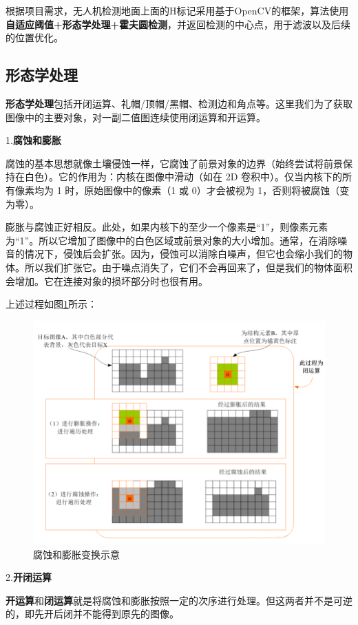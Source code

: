 根据项目需求，无人机检测地面上面的H标记采用基于OpenCV的框架，算法使用\textbf{自适应阈值+形态学处理+霍夫圆检测}，并返回检测的中心点，用于滤波以及后续的位置优化。

\subsection{形态学处理}

\textbf{形态学处理}包括开闭运算、礼帽/顶帽/黑帽、检测边和角点等。这里我们为了获取图像中的主要对象，对一副二值图连续使用闭运算和开运算。

1.\textbf{腐蚀和膨胀}

腐蚀的基本思想就像土壤侵蚀一样，它腐蚀了前景对象的边界（始终尝试将前景保持在白色）。它的作用为：内核在图像中滑动（如在 2D 卷积中）。仅当内核下的所有像素均为 1 时，原始图像中的像素（1 或 0）才会被视为 1，否则将被腐蚀（变为零）。

膨胀与腐蚀正好相反。此处，如果内核下的至少一个像素是“1”，则像素元素为“1”。所以它增加了图像中的白色区域或前景对象的大小增加。通常，在消除噪音的情况下，侵蚀后会扩张。因为，侵蚀可以消除白噪声，但它也会缩小我们的物体。所以我们扩张它。由于噪点消失了，它们不会再回来了，但是我们的物体面积会增加。它在连接对象的损坏部分时也很有用。

上述过程如图\ref{Fig:img0}所示：

\begin{figure}[ht]
  \centering
  \includegraphics[width=0.8\linewidth]{./Figure/Corrosion_and_Expansion.png}
  \caption{腐蚀和膨胀变换示意}\label{Fig:img0}
\end{figure}

2.\textbf{开闭运算}

\textbf{开运算}和\textbf{闭运算}就是将腐蚀和膨胀按照一定的次序进行处理。但这两者并不是可逆的，即先开后闭并不能得到原先的图像。

